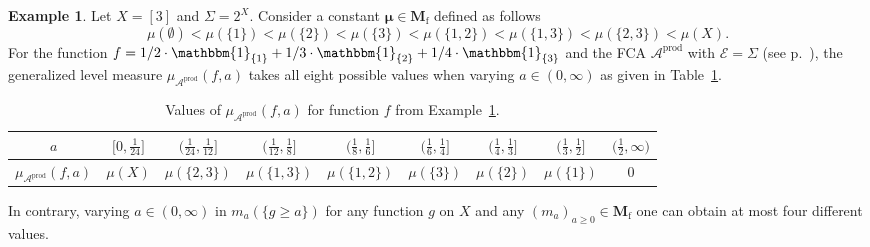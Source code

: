 \documentclass[preprint,11pt]{elsarticle}
\theoremstyle{definition}
\newtheorem{example}[tw]{Example}
\newcommand\bMf{\mathbf{M}_{\mathrm{f}}}%
\newcommand\cE{{\mathcal E}}
\newcommand\bA{\mathscr{A}}%
\newcommand\mub[1][\bA]{\mu_{#1}}
\newcommand{\bmu}{\boldsymbol{\mu}}
\renewcommand\ge{\geqslant}
\newcommand{\mI}[1]{\mathbbm{1}_{#1}}%
\newcommand{\noi}{\noindent}
\begin{document}
\begin{example} \label{ex:4.8}
Let $X=[3]$ and $\Sigma=2^X.$ Consider a constant $\bmu\in\bMf$ defined as follows
$$\mu(\emptyset)<\mu(\{1\})<\mu(\{2\})<\mu(\{3\})<\mu(\{1,2\})<\mu(\{1,3\})<\mu(\{2,3\})<\mu(X).$$
For the function $f=1/2\cdot\mI{\{1\}}+1/3\cdot\mI{\{2\}}+1/4\cdot\mI{\{3\}}$ and the FCA $\bA^{\textrm{prod}}$ with $\cE=\Sigma$ (see p.~\pageref{ref:prod}), the generalized level measure $\mub[\bA^{\textrm{prod}}](f,a)$ takes
all eight possible values %
when varying $a\in (0,\infty)$  as given in Table~\ref{table}.

\begin{table}[h]
 \renewcommand*{\arraystretch}{1.7}
 \begin{center}
 \begin{tabular}{|c|c|c|c|c|c|c|c|c|}
 \hline
 $a$ & $\big[0,\tfrac{1}{24}\big]$ & $\big(\tfrac{1}{24},\tfrac{1}{12}\big]$ & $\big(\tfrac{1}{12},\tfrac{1}{8}\big]$ & $\big(\tfrac{1}{8},\tfrac{1}{6}\big]$ & $\big(\tfrac{1}{6}, \tfrac{1}{4}\big]$ & $\big(\tfrac{1}{4}, \tfrac{1}{3}\big]$ & $\big(\tfrac{1}{3}, \tfrac{1}{2}\big]$ & $\big(\tfrac{1}{2},\infty\big)$ \\ \hline
 $\mub[\bA^{\textrm{prod}}](f,a)$ & $\mu(X)$  & $\mu(\{2,3\})$ & $\mu(\{1,3\})$ & $\mu(\{1,2\})$ & $\mu(\{3\})$ & $\mu(\{2\})$ & $\mu(\{1\})$ & $0$\\\hline
 \end{tabular}
 \caption{Values of $\mub[\bA^{\textrm{prod}}](f,a)$ for function $f$ from Example~\ref{ex:4.8}.}
 \label{table}
 \end{center}
 \end{table}

\noi In contrary, varying $a\in (0,\infty)$ in $m_a(\{g\ge a\})$
for any function $g$ on $X$ and any
$(m_a)_{a\ge 0}\in \bMf$ one can obtain at most four different values.
\medskip
\end{example}
\end{document}

